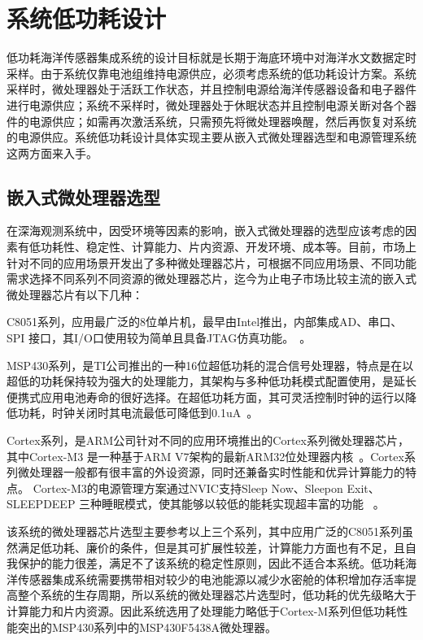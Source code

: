 \chapter{系统低功耗设计}
低功耗海洋传感器集成系统的设计目标就是长期于海底环境中对海洋水文数据定时采样。由于系统仅靠电池组维持电源供应，必须考虑系统的低功耗设计方案。系统采样时，微处理器处于活跃工作状态，并且控制电源给海洋传感器设备和电子器件进行电源供应；系统不采样时，微处理器处于休眠状态并且控制电源关断对各个器件的电源供应；如需再次激活系统，只需预先将微处理器唤醒，然后再恢复对系统的电源供应。系统低功耗设计具体实现主要从嵌入式微处理器选型和电源管理系统这两方面来入手。

\section{嵌入式微处理器选型}
在深海观测系统中，因受环境等因素的影响，嵌入式微处理器的选型应该考虑的因素有低功耗性、稳定性、计算能力、片内资源、开发环境、成本等。目前，市场上针对不同的应用场景开发出了多种微处理器芯片，可根据不同应用场景、不同功能需求选择不同系列不同资源的微处理器芯片，迄今为止电子市场比较主流的嵌入式微处理器芯片有以下几种：

C8051系列，应用最广泛的8位单片机，最早由Intel推出，内部集成AD、串口、SPI 接口，其I/O口使用较为简单且具备JTAG仿真功能。~\cite{2018wxp}。

MSP430系列，是TI公司推出的一种16位超低功耗的混合信号处理器，特点是在以超低的功耗保持较为强大的处理能力，其架构与多种低功耗模式配置使用，是延长便携式应用电池寿命的很好选择。在超低功耗方面，其可灵活控制时钟的运行以降低功耗，时钟关闭时其电流最低可降低到0.1uA~\cite{2008wx}。

Cortex系列，是ARM公司针对不同的应用环境推出的Cortex系列微处理器芯片，其中Cortex-M3 是一种基于ARM V7架构的最新ARM32位处理器内核~\cite{zhao2017design}。Cortex系列微处理器一般都有很丰富的外设资源，同时还兼备实时性能和优异计算能力的特点。 Cortex-M3的电源管理方案通过NVIC支持Sleep Now、Sleepon Exit、SLEEPDEEP 三种睡眠模式，使其能够以较低的能耗实现超丰富的功能~\cite{wx} 。

该系统的微处理器芯片选型主要参考以上三个系列，其中应用广泛的C8051系列虽然满足低功耗、廉价的条件，但是其可扩展性较差，计算能力方面也有不足，且自我保护的能力很差，满足不了该系统的稳定性原则，因此不适合本系统。低功耗海洋传感器集成系统需要携带相对较少的电池能源以减少水密舱的体积增加存活率提高整个系统的生存周期，所以系统的微处理器芯片选型时，低功耗的优先级略大于计算能力和片内资源。因此系统选用了处理能力略低于Cortex-M系列但低功耗性能突出的MSP430系列中的MSP430F5438A微处理器。

